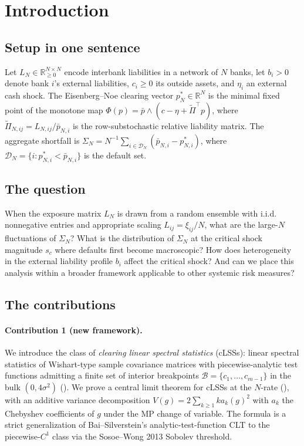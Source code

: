 \documentclass[11pt,a4paper]{article}
\theoremstyle{definition}
\newcommand{\SigmaN}{\Sigma_N}
\newcommand{\Bcal}{\mathcal{B}}
\newcommand{\Dcal}{\mathcal{D}}
\begin{document}
\tableofcontents

\section{Introduction}
\label{sec:intro}

\subsection{Setup in one sentence}

Let $L_N\in\mathbb{R}^{N\times N}_{\geq 0}$ encode interbank liabilities in a
network of $N$ banks, let $b_i>0$ denote bank $i$'s external liabilities,
$c_i\geq 0$ its outside assets, and $\eta_i$ an external cash shock. The
Eisenberg--Noe \cite{EisenbergNoe2001} clearing vector $p^\ast_N\in\mathbb{R}^N$
is the minimal fixed point of the monotone map
$\Phi(p) = \bar p \wedge (c - \eta + \widetilde\Pi^\top p)$, where
$\widetilde\Pi_{N,ij} = L_{N,ij}/\bar p_{N,i}$ is the row-substochastic relative
liability matrix. The aggregate shortfall is
$\SigmaN = N^{-1}\sum_{i\in\Dcal_N}(\bar p_{N,i} - p^\ast_{N,i})$, where
$\Dcal_N = \{i : p^\ast_{N,i}<\bar p_{N,i}\}$ is the default set.

\subsection{The question}

When the exposure matrix $L_N$ is drawn from a random ensemble with i.i.d.
nonnegative entries and appropriate scaling $L_{ij} = \xi_{ij}/N$, what are the
large-$N$ fluctuations of $\SigmaN$? What is the distribution of $\SigmaN$ at
the critical shock magnitude $s_c$ where defaults first become macroscopic?
How does heterogeneity in the external liability profile $b_i$ affect the
critical shock? And can we place this analysis within a broader framework
applicable to other systemic risk measures?

\subsection{The contributions}

\paragraph{Contribution 1 (new framework).} We introduce the class of
\emph{clearing linear spectral statistics} (cLSSs): linear spectral statistics
of Wishart-type sample covariance matrices with piecewise-analytic test
functions admitting a finite set of interior breakpoints
$\Bcal = \{c_1,\dots,c_{m-1}\}$ in the bulk $(0,4\sigma^2)$ ().
We prove a central limit theorem for cLSSs at the $N$-rate (),
with an additive variance decomposition
$V(g) = 2\sum_{k\geq 1}k a_k(g)^2$ with $a_k$ the Chebyshev coefficients of
$g$ under the MP change of variable. The formula is a strict generalization
of Bai--Silverstein's analytic-test-function CLT to the piecewise-$C^1$
class via the Sosoe--Wong 2013 Sobolev threshold.
\end{document}

